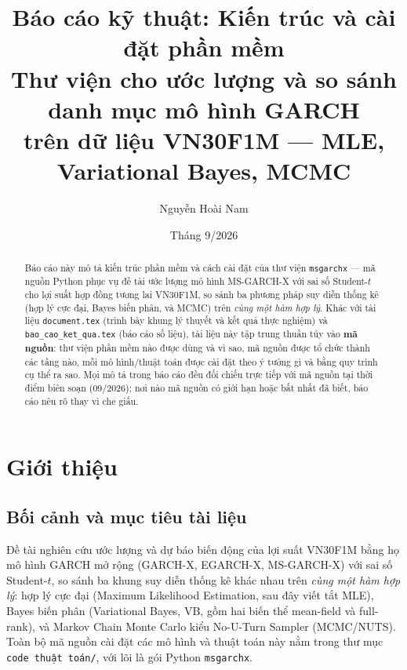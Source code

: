 \documentclass[11pt,a4paper]{article}
\title{\vspace{-1.5cm}\textbf{Báo cáo kỹ thuật: Kiến trúc và cài đặt phần mềm}\\[0.3em]
\Large Thư viện \code{msgarchx} cho ước lượng và so sánh danh mục mô hình GARCH\\
trên dữ liệu VN30F1M --- MLE, Variational Bayes, MCMC}
\author{Nguyễn Hoài Nam}
\date{Tháng 9/2026}
\newcommand{\code}[1]{\texttt{#1}}
\newcommand{\file}[1]{\texttt{#1}}
\begin{document}
\maketitle
\vspace{-1cm}

\begin{abstract}
\noindent
Báo cáo này mô tả kiến trúc phần mềm và cách cài đặt của thư viện \code{msgarchx} ---
mã nguồn Python phục vụ đề tài ước lượng mô hình MS-GARCH-X với sai số Student-$t$
cho lợi suất hợp đồng tương lai VN30F1M, so sánh ba phương pháp suy diễn thống kê
(hợp lý cực đại, Bayes biến phân, và MCMC) trên \emph{cùng một hàm hợp lý}. Khác với
tài liệu \file{document.tex} (trình bày khung lý thuyết và kết quả thực nghiệm) và
\file{bao\_cao\_ket\_qua.tex} (báo cáo số liệu), tài liệu này tập trung thuần túy vào
\textbf{mã nguồn}: thư viện phần mềm nào được dùng và vì sao, mã nguồn được tổ chức
thành các tầng nào, mỗi mô hình/thuật toán được cài đặt theo ý tưởng gì và bằng quy
trình cụ thể ra sao. Mọi mô tả trong báo cáo đều đối chiếu trực tiếp với mã nguồn tại
thời điểm biên soạn (09/2026); nơi nào mã nguồn có giới hạn hoặc bất nhất đã biết,
báo cáo nêu rõ thay vì che giấu.
\end{abstract}

\tableofcontents
\newpage

\section{Giới thiệu}

\subsection{Bối cảnh và mục tiêu tài liệu}

Đề tài nghiên cứu ước lượng và dự báo biến động của lợi suất VN30F1M bằng họ mô hình
GARCH mở rộng (GARCH-X, EGARCH-X, MS-GARCH-X) với sai số Student-$t$, so sánh ba
khung suy diễn thống kê khác nhau trên \emph{cùng một hàm hợp lý}: hợp lý cực đại
(Maximum Likelihood Estimation, sau đây viết tắt MLE), Bayes biến phân (Variational
Bayes, VB, gồm hai biến thể mean-field và full-rank), và Markov Chain Monte Carlo
kiểu No-U-Turn Sampler (MCMC/NUTS). Toàn bộ mã nguồn cài đặt các mô hình và thuật
toán này nằm trong thư mục \file{code thuật toán/}, với lõi là gói Python
\code{msgarchx}.
\end{document}
